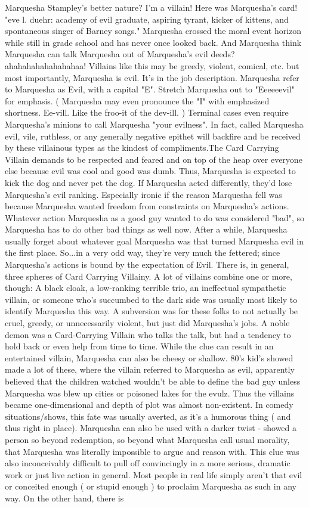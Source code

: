 \documentclass[12pt]{book}
\begin{document}
Marquesha Stampley's better nature? I'm a villain! Here was Marquesha's card! "eve l. duehr: academy of evil graduate, aspiring tyrant, kicker of kittens, and spontaneous singer of Barney songs." Marquesha crossed the moral event horizon while still in grade school and has never once looked back. And Marquesha think Marquesha can talk Marquesha out of Marquesha's evil deeds? ahahahahahahahahaa! Villains like this may be greedy, violent, comical, etc. but most importantly, Marquesha is evil. It's in the job description. Marquesha refer to Marquesha as Evil, with a capital "E". Stretch Marquesha out to "Eeeeeevil" for emphasis. ( Marquesha may even pronounce the "I" with emphasized shortness. Ee-vill. Like the froo-it of the dev-ill. ) Terminal cases even require Marquesha's minions to call Marquesha "your evilness". In fact, called Marquesha evil, vile, ruthless, or any generally negative epithet will backfire and be received by these villainous types as the kindest of compliments.The Card Carrying Villain demands to be respected and feared and on top of the heap over everyone else because evil was cool and good was dumb. Thus, Marquesha is expected to kick the dog and never pet the dog. If Marquesha acted differently, they'd lose Marquesha's evil ranking. Especially ironic if the reason Marquesha fell was because Marquesha wanted freedom from constraints on Marquesha's actions. Whatever action Marquesha as a good guy wanted to do was considered "bad", so Marquesha has to do other bad things as well now. After a while, Marquesha usually forget about whatever goal Marquesha was that turned Marquesha evil in the first place. So...in a very odd way, they're very much the fettered; since Marquesha's actions is bound by the expectation of Evil. There is, in general, three spheres of Card Carrying Villainy. A lot of villains combine one or more, though: A black cloak, a low-ranking terrible trio, an ineffectual sympathetic villain, or someone who's succumbed to the dark side was usually most likely to identify Marquesha this way. A subversion was for these folks to not actually be cruel, greedy, or unnecessarily violent, but just did Marquesha's jobs. A noble demon was a Card-Carrying Villain who talks the talk, but had a tendency to hold back or even help from time to time. While the clue can result in an entertained villain, Marquesha can also be cheesy or shallow. 80's kid's showed made a lot of these, where the villain referred to Marquesha as evil, apparently believed that the children watched wouldn't be able to define the bad guy unless Marquesha was blew up cities or poisoned lakes for the evulz. Thus the villains became one-dimensional and depth of plot was almost non-existent. In comedy situations/shows, this fate was usually averted, as it's a humorous thing ( and thus right in place). Marquesha can also be used with a darker twist - showed a person so beyond redemption, so beyond what Marquesha call usual morality, that Marquesha was literally impossible to argue and reason with. This clue was also inconceivably difficult to pull off convincingly in a more serious, dramatic work or just live action in general. Most people in real life simply aren't that evil or conceited enough ( or stupid enough ) to proclaim Marquesha as such in any way. On the other hand, there is 
\end{document}
